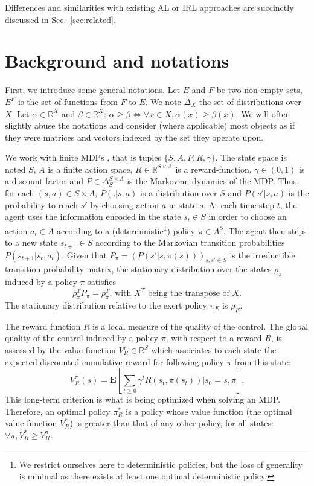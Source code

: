 \documentclass[smallextended]{svjour3}
\newcommand{\E}{\mathbf{E}}
\begin{document}
Differences and similarities with existing AL or IRL approaches are succinctly discussed in Sec.~\ref{sec:related}.
\section{Background and notations}
\label{sec:background}
First, we introduce some general notations.
Let $E$ and $F$ be two non-empty sets, $E^F$ is the set of functions from $F$ to $E$.
We note $\Delta_X$ the set of distributions over $X$.
Let $\alpha\in\mathbb{R}^X$ and $\beta\in\mathbb{R}^X$: $\alpha\geq\beta \Leftrightarrow \forall x\in X, \alpha(x) \geq \beta(x)$. We will often slightly abuse the notations and consider (where applicable) most objects as if they were matrices and vectors indexed by the set they operate upon.

We work with finite MDPs \cite{puterman1994markov}, that is tuples $\{S,A,P,R,\gamma\}$. The state space is noted $S$, $A$ is a finite action space, $R\in\mathbb{R}^{S\times A}$ is a reward-function, $\gamma\in (0,1)$ is a discount factor and $P\in \Delta_{S}^{S\times A}$ is the Markovian dynamics of the MDP. Thus, for each $(s,a)\in S\times A$, $P(.|s,a)$ is a distribution over $S$ and $P(s'|s,a)$ is the probability to reach $s'$ by choosing action $a$ in state $s$. At each time step $t$, the agent uses the information encoded in the state $s_t\in S$ in order to choose an action $a_t \in A$ according to a (deterministic\footnote{We restrict ourselves here to deterministic policies, but the loss of generality is minimal as there exists at least one optimal deterministic policy.}) policy $\pi\in A^S$. The agent then steps to a new state $s_{t+1}\in S$ according to the Markovian transition probabilities $P(s_{t+1}|s_t,a_t)$. Given that $P_\pi = (P(s'|s,\pi(s)))_{s,s' \in S}$ is the irreductible transition probability matrix, the stationary distribution over the states $\rho_\pi$ induced by a policy $\pi$ satisfies
\begin{equation}
  \rho_\pi^TP_\pi = \rho_\pi^T\textrm{, with }X^T\textrm{ being the transpose of }X.
  \end{equation}
The stationary distribution relative to the exert policy $\pi_E$ is $\rho_E$.

The reward function $R$ is a local measure of the quality of the control. The global quality of the control induced by a policy $\pi$, with respect to a reward $R$, is assessed by the value function $V^\pi_R \in \mathbb{R}^{S}$ which associates to each state the expected discounted cumulative reward for following policy $\pi$ from this state:
\begin{equation}
V^\pi_R(s) = \E[\sum_{t\geq 0}\gamma^tR(s_t,\pi(s_t))|s_0 = s,\pi].
\end{equation}
This long-term criterion is what is being optimized when solving an MDP. Therefore, an optimal policy $\pi^*_R$ is a policy whose value function (the optimal value function $V^*_R$) is greater than that of any other policy, for all states: $\forall \pi, V^*_R\geq V^\pi_R$.
\end{document}
